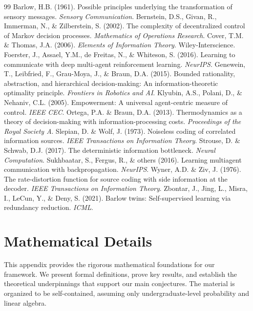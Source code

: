 \documentclass[10pt, letterpaper]{article}
\begin{document}
\begin{thebibliography}{99}
 Barlow, H.B. (1961). Possible principles underlying the transformation of sensory messages. \emph{Sensory Communication}.
 Bernstein, D.S., Givan, R., Immerman, N., \& Zilberstein, S. (2002). The complexity of decentralized control of Markov decision processes. \emph{Mathematics of Operations Research}.
 Cover, T.M. \& Thomas, J.A. (2006). \emph{Elements of Information Theory}. Wiley-Interscience.
 Foerster, J., Assael, Y.M., de Freitas, N., \& Whiteson, S. (2016). Learning to communicate with deep multi-agent reinforcement learning. \emph{NeurIPS}.
 Genewein, T., Leibfried, F., Grau-Moya, J., \& Braun, D.A. (2015). Bounded rationality, abstraction, and hierarchical decision-making: An information-theoretic optimality principle. \emph{Frontiers in Robotics and AI}.
 Klyubin, A.S., Polani, D., \& Nehaniv, C.L. (2005). Empowerment: A universal agent-centric measure of control. \emph{IEEE CEC}.
 Ortega, P.A. \& Braun, D.A. (2013). Thermodynamics as a theory of decision-making with information-processing costs. \emph{Proceedings of the Royal Society A}.
 Slepian, D. \& Wolf, J. (1973). Noiseless coding of correlated information sources. \emph{IEEE Transactions on Information Theory}.
 Strouse, D. \& Schwab, D.J. (2017). The deterministic information bottleneck. \emph{Neural Computation}.
 Sukhbaatar, S., Fergus, R., \& others (2016). Learning multiagent communication with backpropagation. \emph{NeurIPS}.
 Wyner, A.D. \& Ziv, J. (1976). The rate-distortion function for source coding with side information at the decoder. \emph{IEEE Transactions on Information Theory}.
 Zbontar, J., Jing, L., Misra, I., LeCun, Y., \& Deny, S. (2021). Barlow twins: Self-supervised learning via redundancy reduction. \emph{ICML}.
\end{thebibliography}

\appendix

\section{Mathematical Details}
\label{app:math}

This appendix provides the rigorous mathematical foundations for our framework. We present formal definitions, prove key results, and establish the theoretical underpinnings that support our main conjectures. The material is organized to be self-contained, assuming only undergraduate-level probability and linear algebra.
\end{document}
